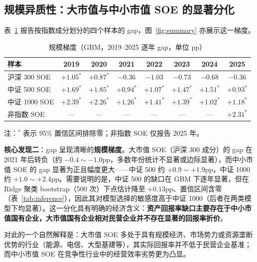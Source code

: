 \documentclass[11pt,a4paper]{ctexart}
\begin{document}
\subsection{规模异质性：大市值与中小市值 SOE 的显著分化}

表~\ref{tab:size_gradient} 报告按指数成分划分的四个样本的 gap，图~\ref{fig:summary} 亦展示这一梯度。

\begin{table}[htbp]
\centering
\caption{规模梯度（GBM，2019--2025 逐年 gap，单位 pp）}
\label{tab:size_gradient}
\begin{threeparttable}
\small
\begin{tabular}{lccccccc}
\toprule
样本 & 2019 & 2020 & 2021 & 2022 & 2023 & 2024 & 2025 \\
\midrule
沪深 300 SOE & $+1.05^{*}$ & $+0.87^{*}$ & $-0.36$ & $-1.03$ & $-0.73$ & $-0.68$ & $-0.36$ \\
中证 500 SOE & $+1.69^{*}$ & $+1.85^{*}$ & $+0.94^{*}$ & $+1.07^{*}$ & $+1.47^{*}$ & $+1.51^{*}$ & $+0.93^{*}$ \\
中证 1000 SOE & $+2.39^{*}$ & $+2.26^{*}$ & $+1.26^{*}$ & $+1.41^{*}$ & $+1.39^{*}$ & $+1.02^{*}$ & $+1.18^{*}$ \\
非指数 SOE & --- & --- & --- & --- & --- & --- & $+2.31^{*}$ \\
\bottomrule
\end{tabular}
\begin{tablenotes}
\footnotesize\raggedright
\item 注：$^{*}$ 表示 95\% 置信区间排除零；非指数 SOE 仅报告 2025 年。
\end{tablenotes}
\end{threeparttable}
\end{table}

\medskip
\noindent\textbf{核心发现二}：gap 呈现清晰的\textbf{规模梯度}。大市值 SOE（沪深 300 成分）的 gap 在 2021 年后转负（约 $-0.4\sim-1.0$pp，多数年份统计不显著或边际显著），而中小市值 SOE 的 gap 显著为正且幅度更大——中证 500 约 $+0.9\sim+1.9$pp，中证 1000 约 $+1.0\sim+2.4$pp。需要说明的是，中证 500 的缺口在 GBM 下逐年显著，但在 Ridge 聚类 bootstrap（500 次）下点估计降至 $+0.13$pp、置信区间含零（表~\ref{tab:inference}），因此其对模型选择的敏感度高于中证 1000（后者在两类模型下均显著）。这一分化具有明确的经济含义：\textbf{资产回报率缺口主要存在于中小市值国有企业，大市值国有企业相对民营企业并不存在显著的回报率折价}。

对此的一个自然解释是：大市值 SOE 多处于具有规模经济、市场势力或资源垄断优势的行业（能源、电信、大型基建等），其实际回报率并不低于民营企业基准；而中小市值 SOE 在竞争性行业中的经营效率劣势更为凸显。
\end{document}
